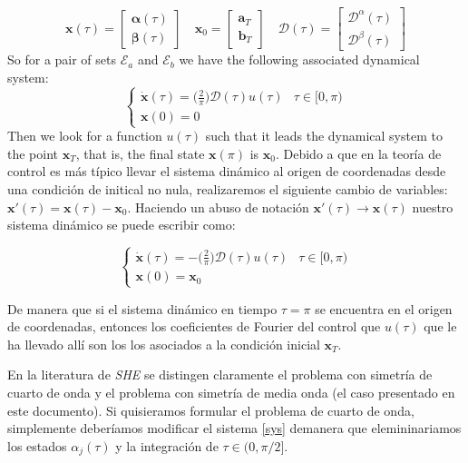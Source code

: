 \begin{equation}
    \bm{x}(\tau) = \begin{bmatrix}
        \bm{\alpha}(\tau) \\  \bm{\beta}(\tau)
    \end{bmatrix} \hspace{1em}
    \bm{x}_0 = \begin{bmatrix}
        \bm{a}_T \\  \bm{b}_T
    \end{bmatrix} \hspace{1em}
    \bm{\mathcal{D}}(\tau) = \begin{bmatrix}
        \bm{\mathcal{D}}^\alpha(\tau) \\  
        \bm{\mathcal{D}}^\beta(\tau)
    \end{bmatrix}     
\end{equation}
So for a pair of sets $ \mathcal {E} _a $ and $ \mathcal {E} _b $ we have the following associated dynamical system:
\begin{equation}
    \begin{cases}
        \dot{\bm{x}}(\tau) = \big(\frac{2}{\pi}\big)\bm{\mathcal{D}}(\tau) u(\tau)  & \tau \in [0,\pi)\\
        \bm{x}(0) = {0}
    \end{cases}
\end{equation}
Then we look for a function $ u (\tau) $ such that it leads the dynamical system to the point $ \bm {x} _T $, that is, the final state $ \bm {x} (\pi) $ is $ \bm {x}_0 $. Debido a que en la teoría de control es más típico llevar el sistema dinámico al origen de coordenadas desde una condición de initical no nula, realizaremos el siguiente cambio de variables: $\bm{x}'(\tau) = \bm{x}(\tau) - \bm{x}_0$. Haciendo un abuso de notación $\bm{x}'(\tau) \rightarrow \bm{x}(\tau)$  nuestro sistema dinámico se puede escribir como:

\begin{equation}\label{sys}
    \begin{cases}
        \dot{\bm{x}}(\tau) = -\big(\frac{2}{\pi}\big)\bm{\mathcal{D}}(\tau) u(\tau)  & \tau \in [0,\pi)\\
        \bm{x}(0) = \bm{x}_0
    \end{cases}
\end{equation}

De manera que si el sistema dinámico en tiempo $\tau = \pi$ se encuentra en el origen de coordenadas, entonces los coeficientes de Fourier del control que $u(\tau)$ que le ha llevado allí son los los asociados a la condición inicial $\bm{x}_T$. 
\newline 
\begin{remark}
    En la literatura de \emph{SHE} se distingen claramente el problema con simetría de cuarto de onda y el problema con simetría de media onda (el caso presentado en este documento). Si quisieramos formular el problema de cuarto de onda, simplemente deberíamos modificar el sistema \ref{sys} demanera que elemininariamos los estados $\alpha_j(\tau)$ y la integración de $\tau \in (0,\pi/2]$.
\end{remark}